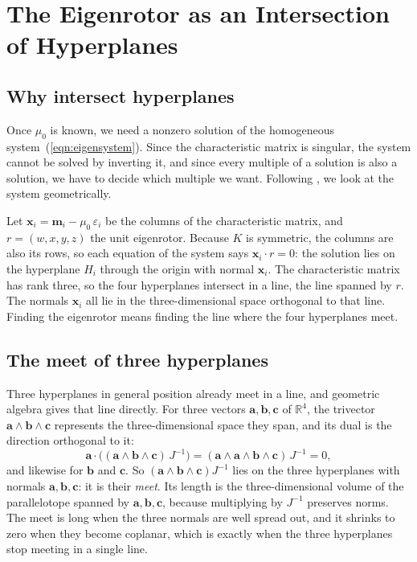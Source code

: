 \documentclass{birkjour}
\theoremstyle{definition}
\theoremstyle{remark}
\numberwithin{equation}{section}
\newcommand{\R}{\mathbb{R}}
\begin{document}
\section{The Eigenrotor as an Intersection of Hyperplanes}
\label{section:intersection}

\subsection{Why intersect hyperplanes}

Once $\mu_0$ is known, we need a nonzero solution of the homogeneous system~(\ref{eqn:eigensystem}). Since the characteristic matrix is singular, the system cannot be solved by inverting it, and since every multiple of a solution is also a solution, we have to decide which multiple we want. Following \cite{DeKeninck2019}, we look at the system geometrically.

Let $\mathbf x_i = \mathbf m_i - \mu_0\, \varepsilon_i$ be the columns of the characteristic matrix, and $r = (w, x, y, z)$ the unit eigenrotor. Because $K$ is symmetric, the columns are also its rows, so each equation of the system says $\mathbf x_i \cdot r = 0$: the solution lies on the hyperplane $H_i$ through the origin with normal $\mathbf x_i$. The characteristic matrix has rank three, so the four hyperplanes intersect in a line, the line spanned by $r$. The normals $\mathbf x_i$ all lie in the three-dimensional space orthogonal to that line. Finding the eigenrotor means finding the line where the four hyperplanes meet.

\subsection{The meet of three hyperplanes}

Three hyperplanes in general position already meet in a line, and geometric algebra gives that line directly. For three vectors $\mathbf a, \mathbf b, \mathbf c$ of $\R^4$, the trivector $\mathbf a \wedge \mathbf b \wedge \mathbf c$ represents the three-dimensional space they span, and its dual is the direction orthogonal to it:
\begin{equation}
\label{eqn:meet}
\mathbf a \cdot \big( (\mathbf a \wedge \mathbf b \wedge \mathbf c)\, J^{-1} \big) = (\mathbf a \wedge \mathbf a \wedge \mathbf b \wedge \mathbf c)\, J^{-1} = 0,
\end{equation}
and likewise for $\mathbf b$ and $\mathbf c$. So $(\mathbf a \wedge \mathbf b \wedge \mathbf c) J^{-1}$ lies on the three hyperplanes with normals $\mathbf a, \mathbf b, \mathbf c$: it is their \emph{meet}. Its length is the three-dimensional volume of the parallelotope spanned by $\mathbf a, \mathbf b, \mathbf c$, because multiplying by $J^{-1}$ preserves norms. The meet is long when the three normals are well spread out, and it shrinks to zero when they become coplanar, which is exactly when the three hyperplanes stop meeting in a single line.
\end{document}

